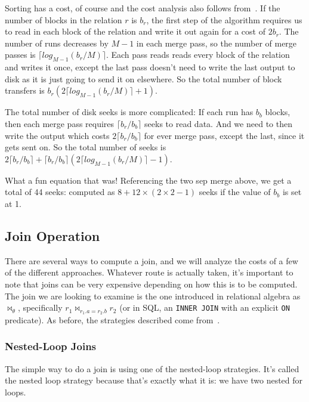 Sorting has a cost, of course and the cost analysis also follows from~\cite{dsc}. If the number of blocks in the relation $r$ is $b_{r}$, the first step of the algorithm requires us to read in each block of the relation and write it out again for a cost of $2b_{r}$. The number of runs decreases by $M-1$ in each merge pass, so the number of merge passes is $\lceil log_{M-1}(b_{r}/M)\rceil$. Each pass reads reads every block of the relation and writes it once, except the last pass doesn't need to write the last output to disk as it is just going to send it on elsewhere. So the total number of block transfers is $b_{r}(2\lceil log_{M-1}(b_{r}/M)\rceil + 1)$. 

The total number of disk seeks is more complicated: If each run has $b_{b}$ blocks, then each merge pass requires $\lceil b_{r}/b_{b}\rceil$ seeks to read data. And we need to then write the output which costs  $2\lceil b_{r}/b_{b}\rceil$ for ever merge pass, except the last, since it gets sent on. So the total number of seeks is $2\lceil b_{r}/b_{b}\rceil + \lceil b_{r}/b_{b}\rceil(2 \lceil log_{M-1}(b_{r}/M)\rceil - 1)$.

What a fun equation that was! Referencing the two sep merge above, we get a total of 44 seeks: computed as $8 + 12 \times (2 \times 2 - 1)$ seeks if the value of $b_{b}$ is set at 1.

\subsection*{Join Operation}

There are several ways to compute a join, and we will analyze the costs of a few of the different approaches. Whatever route is actually taken, it's important to note that joins can be very expensive depending on how this is to be computed. The join we are looking to examine is the one introduced in relational algebra as $\Join_{\theta}$, specifically $r_{1} \Join_{r_{1}.a = r_{2}.b} r_{2}$ (or in SQL, an \texttt{INNER JOIN} with an explicit \texttt{ON} predicate). As before, the strategies described come from~\cite{dsc}.

\subsubsection*{Nested-Loop Joins}

The simple way to do a join is using one of the nested-loop strategies. It's called the nested loop strategy because that's exactly what it is: we have two nested for loops.

